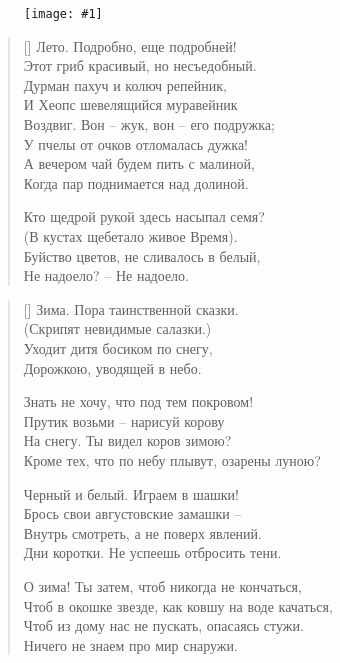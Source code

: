 \documentclass[12pt,a5paper,twoside]{article}
\newcommand{\pict}[1]{\thispagestyle{empty}\begin{figure}[H]\begin{center}\texttt{[image: \#1]}\end{center}\end{figure}\newpage}
\begin{document}
\pict{picts/Tango_Leto} 
%
\begin{spacing}{0.8}
\settowidth{\versewidth}{Лето. Подробно, еще подробней!}
\begin{verse}[\versewidth]
Лето. Подробно, еще подробней!\\
Этот гриб красивый, но несъедобный.\\
Дурман пахуч и колюч репейник,\\
И Хеопс шевелящийся муравейник\\
Воздвиг. Вон – жук, вон – его подружка;\\
У пчелы от очков отломалась дужка!\\
А вечером чай будем пить с малиной,\\
Когда пар поднимается над долиной.

Кто щедрой рукой здесь насыпал семя?\\
(В кустах щебетало живое Время).\\
Буйство цветов, не сливалось в белый,\\
Не надоело? – Не надоело.
\end{verse}
	
\settowidth{\versewidth}{Зима. Пора таинственной сказки.}
\begin{verse}[\versewidth]
Зима. Пора таинственной сказки.\\
(Скрипят невидимые салазки.)\\
Уходит дитя босиком по снегу,\\
Дорожкою, уводящей в небо.

Знать не хочу, что под тем покровом!\\
Прутик возьми – нарисуй корову\\
На снегу. Ты видел коров зимою?\\
Кроме тех, что по небу плывут, озарены луною?

Черный и белый. Играем в шашки!\\
Брось свои августовские замашки –\\
Внутрь смотреть, а не поверх явлений.\\
Дни коротки. Не успеешь отбросить тени.

О зима! Ты затем, чтоб никогда не кончаться,\\
Чтоб в окошке звезде, как ковшу на воде качаться,\\
Чтоб из дому нас не пускать, опасаясь стужи.\\
Ничего не знаем про мир снаружи.
\end{verse}
\end{spacing}
\newpage
\end{document}
